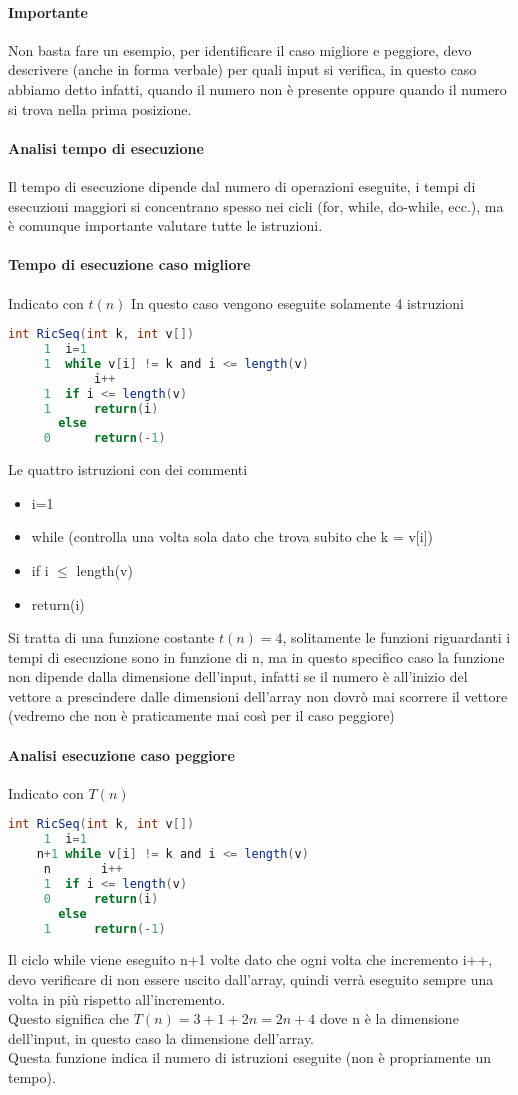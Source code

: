 \paragraph*{Importante} Non basta fare un esempio, per identificare il caso migliore e peggiore,
devo descrivere (anche in forma verbale) per quali input si verifica, in questo caso abbiamo detto infatti, quando
il numero non è presente oppure quando il numero si trova nella prima posizione.
\paragraph*{Analisi tempo di esecuzione} Il tempo di esecuzione dipende dal numero di operazioni
eseguite, i tempi di esecuzioni maggiori si concentrano spesso nei cicli (for, while, do-while, ecc.),
ma è comunque importante valutare tutte le istruzioni.
\paragraph*{Tempo di esecuzione caso migliore} Indicato con $t(n)$ In questo caso vengono eseguite solamente 4 istruzioni
\begin{lstlisting}[language=Java]
    int RicSeq(int k, int v[])
     1  i=1
     1  while v[i] != k and i <= length(v)
            i++
     1  if i <= length(v)
     1      return(i)
       else
     0      return(-1)
\end{lstlisting}
Le quattro istruzioni con dei commenti
\begin{itemize}
    \item i=1
    \item while (controlla una volta sola dato che trova subito che k = v[i])
    \item if i $\leq$ length(v) 
    \item return(i)
\end{itemize}
Si tratta di una funzione costante $t(n) = 4$, solitamente le funzioni riguardanti i tempi
di esecuzione sono in funzione di n, ma in questo specifico caso la funzione non dipende
dalla dimensione dell'input, infatti se il numero è all'inizio del vettore a prescindere dalle
dimensioni dell'array non dovrò mai scorrere il vettore (vedremo che non è praticamente mai così per
il caso peggiore)
\paragraph*{Analisi esecuzione caso peggiore} Indicato con $T(n)$
\begin{lstlisting}[language=Java]
    int RicSeq(int k, int v[])
     1  i=1
    n+1 while v[i] != k and i <= length(v)
     n       i++
     1  if i <= length(v)
     0      return(i)
       else
     1      return(-1)
\end{lstlisting}
Il ciclo while viene eseguito n+1 volte dato che ogni volta che incremento i++, devo
verificare di non essere uscito dall'array, quindi verrà eseguito sempre una volta in più
rispetto all'incremento.\\
Questo significa che $T(n) = 3 + 1 +2n = 2n + 4$ dove n è la dimensione dell'input, in
questo caso la dimensione dell'array.\\
Questa funzione indica il numero di istruzioni eseguite (non è propriamente un tempo).\\

